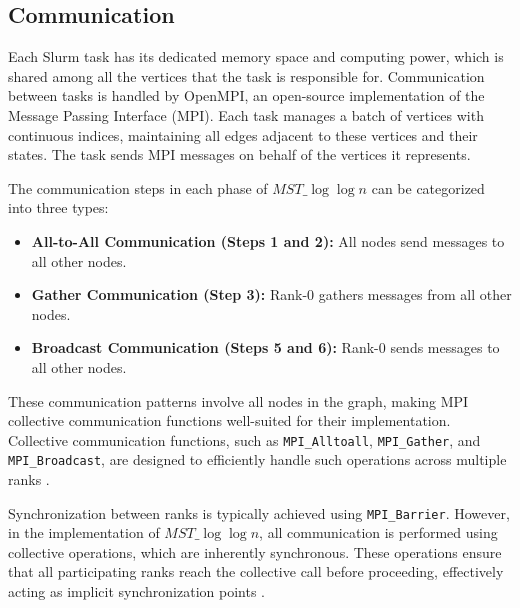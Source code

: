 \documentclass[english, 12pt, a4paper, elec, utf8, a-2b, online]{aaltothesis}
\newcommand{\mstalgo}{$MST\_\log\log{n}$}
\begin{document}
\subsection{Communication}
Each Slurm task has its dedicated memory space and computing power, which is shared among all the vertices that the task is responsible for. Communication between tasks is handled by OpenMPI, an open-source implementation of the Message Passing Interface (MPI). Each task manages a batch of vertices with continuous indices, maintaining all edges adjacent to these vertices and their states. The task sends MPI messages on behalf of the vertices it represents.

The communication steps in each phase of \mstalgo{} can be categorized into three types:
\begin{itemize}
	\item \textbf{All-to-All Communication (Steps 1 and 2):} All nodes send messages to all other nodes.
	\item \textbf{Gather Communication (Step 3):} Rank-0 gathers messages from all other nodes.
	\item \textbf{Broadcast Communication (Steps 5 and 6):} Rank-0 sends messages to all other nodes.
\end{itemize}

These communication patterns involve all nodes in the graph, making MPI collective communication functions well-suited for their implementation. Collective communication functions, such as \texttt{MPI\_Alltoall}, \texttt{MPI\_Gather}, and \texttt{MPI\_Broadcast}, are designed to efficiently handle such operations across multiple ranks \cite{MPI}.

\begin{tcolorbox}[colback=white,colframe=black,boxrule=1pt,arc=0pt]
Synchronization between ranks is typically achieved using \texttt{MPI\_Barrier}. However, in the implementation of \mstalgo{}, all communication is performed using collective operations, which are inherently synchronous. These operations ensure that all participating ranks reach the collective call before proceeding, effectively acting as implicit synchronization points \cite{MPI}.
\end{tcolorbox}
\end{document}
